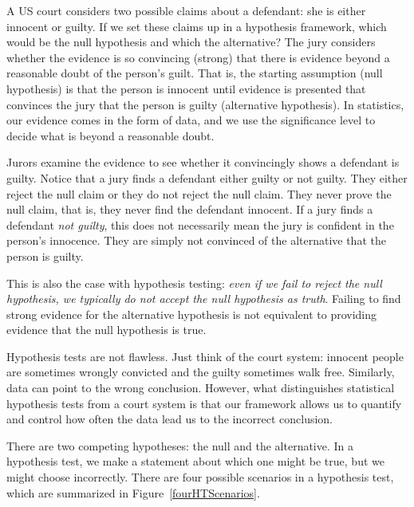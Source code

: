 \begin{examplewrap}
\begin{nexample}{A US court considers two possible claims about a defendant: she is either innocent or guilty. If we set these claims up in a hypothesis framework, which would be the null hypothesis and which the alternative?}\label{hypTestCourtExample}
The jury considers whether the evidence is so convincing (strong) that there is evidence beyond a reasonable doubt of the person's guilt. That is, the starting assumption (null hypothesis) is that the person is innocent until evidence is presented that convinces the jury that the person is guilty (alternative hypothesis). In statistics, our evidence comes in the form of data, and we use the significance level to decide what is beyond a reasonable doubt.
\end{nexample}
\end{examplewrap}

Jurors examine the evidence to see whether it convincingly shows a defendant is guilty. Notice that a jury finds a defendant either guilty or not guilty. They either reject the null claim or they do not reject the null claim. They never prove the null claim, that is, they never find the defendant innocent. If a jury finds a defendant \emph{not guilty}, this does not necessarily mean the jury is confident in the person's innocence. They are simply not convinced of the alternative that the person is guilty.

This is also the case with hypothesis testing: \emph{even if we fail to reject the null hypothesis, we typically do not accept the null hypothesis as truth}. Failing to find strong evidence for the alternative hypothesis is not equivalent to providing evidence that the null hypothesis is true.


Hypothesis tests are not flawless. Just think of the court system: innocent people are sometimes wrongly convicted and the guilty sometimes walk free. Similarly, data can point to the wrong conclusion. However, what distinguishes statistical hypothesis tests from a court system is that our framework allows us to quantify and control how often the data lead us to the incorrect conclusion.

There are two competing hypotheses: the null and the alternative. In a hypothesis test, we make a statement about which one might be true, but we might choose incorrectly. There are four possible scenarios in a hypothesis test, which are summarized in Figure~\ref{fourHTScenarios}.

